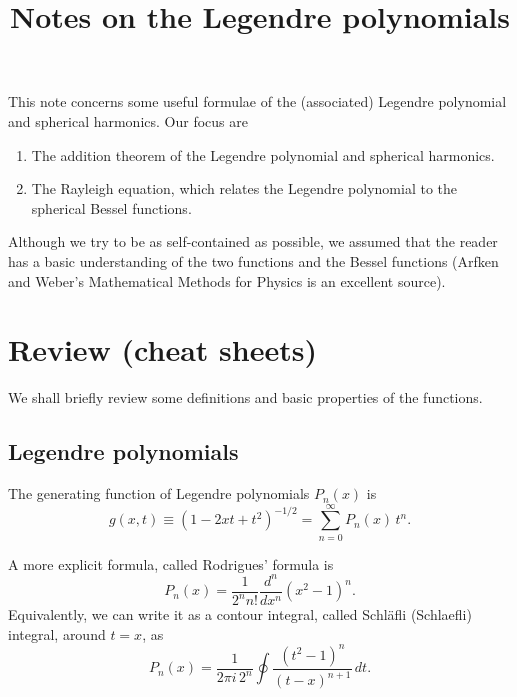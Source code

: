 \documentclass[11pt]{article}
\begin{document}
\title{Notes on the Legendre polynomials}
\author{ \vspace{-10ex} }
\date{ \vspace{-10ex} }
\maketitle



This note concerns some useful formulae of
the (associated) Legendre polynomial
and spherical harmonics.
%
Our focus are
\begin{enumerate}
  \item The addition theorem of the Legendre polynomial and spherical harmonics.
  \item The Rayleigh equation, which relates the Legendre polynomial
        to the spherical Bessel functions.
\end{enumerate}

Although we try to be as self-contained as possible,
we assumed that the reader
has a basic understanding of the two functions
and the Bessel functions
(Arfken and Weber's Mathematical Methods for Physics\cite{arfken}
is an excellent source).






\section{Review (cheat sheets)}



We shall briefly review some definitions and basic properties of the functions.



\subsection{Legendre polynomials}



The generating function of Legendre polynomials $P_n(x)$ is
%
\begin{equation}
  g(x, t)
\equiv
  (1 - 2 x t + t^2)^{-1/2}
=
  \sum_{n = 0}^\infty P_n(x) \, t^n.
  \label{eq:legendre_gf}
\end{equation}

A more explicit formula, called Rodrigues' formula is
%
\begin{equation}
  P_n(x)
=
  \frac{1}{2^n n!}
  \frac{d^n}{dx^n}
  (x^2 - 1)^n.
  \label{eq:legendre_rodrigues}
\end{equation}
%
Equivalently, we can write it as a contour integral,
called Schl\"{a}fli (Schlaefli) integral, around $t = x$, as
\begin{equation}
  P_n(x)
=
  \frac{1}{2\pi i \, 2^n}
  \oint
  \frac{ (t^2 - 1)^n } { (t - x)^{n+1} } \, dt.
  \label{eq:legendre_schlaefli}
\end{equation}
\end{document}
